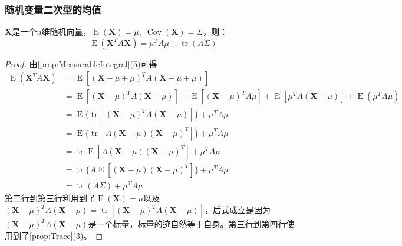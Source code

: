 \subsubsection{随机变量二次型的均值}
\begin{theorem}\label{theo:ERVQuadraticForm}
	$\mathbf{X}$是一个$n$维随机向量，$\operatorname{E}(\mathbf{X})=\mu,\;\operatorname{Cov}(\mathbf{X})=\Sigma$，则：
	\begin{equation*}
		\operatorname{E}(\mathbf{X}^TA\mathbf{X})=\mu^TA\mu+\operatorname{tr}(A\Sigma)
	\end{equation*}	
\end{theorem}
\begin{proof}
	由\cref{prop:MeasurableIntegral}(5)可得
	\begin{align*}
		\operatorname{E}(\mathbf{X}^TA\mathbf{X})
		&=\operatorname{E}[(\mathbf{X}-\mu+\mu)^TA(\mathbf{X}-\mu+\mu)] \\
		&=\operatorname{E}[(\mathbf{X}-\mu)^TA(\mathbf{X}-\mu)]+\operatorname{E}[(\mathbf{X}-\mu)^TA\mu]+\operatorname{E}[\mu^TA(\mathbf{X}-\mu)]+\operatorname{E}(\mu^TA\mu) \\
		&=\operatorname{E}\{\operatorname{tr}[(\mathbf{X}-\mu)^TA(\mathbf{X}-\mu)]\}+\mu^TA\mu \\
		&=\operatorname{E}\{\operatorname{tr}[A(\mathbf{X}-\mu)(\mathbf{X}-\mu)^T]\}+\mu^TA\mu \\
		&=\operatorname{tr}\operatorname{E}[A(\mathbf{X}-\mu)(\mathbf{X}-\mu)^T]+\mu^TA\mu \\
		&=\operatorname{tr}\{A\operatorname{E}[(\mathbf{X}-\mu)(\mathbf{X}-\mu)^T]\}+\mu^TA\mu \\
		&=\operatorname{tr}(A\Sigma)+\mu^TA\mu
	\end{align*}
	第二行到第三行利用到了$\operatorname{E}(\mathbf{X})=\mu$以及$(\mathbf{X}-\mu)^TA(\mathbf{X}-\mu)=\operatorname{tr}[(\mathbf{X}-\mu)^TA(\mathbf{X}-\mu)]$，后式成立是因为$(\mathbf{X}-\mu)^TA(\mathbf{X}-\mu)$是一个标量，标量的迹自然等于自身。第三行到第四行使用到了\cref{prop:Trace}(3)。
\end{proof}
